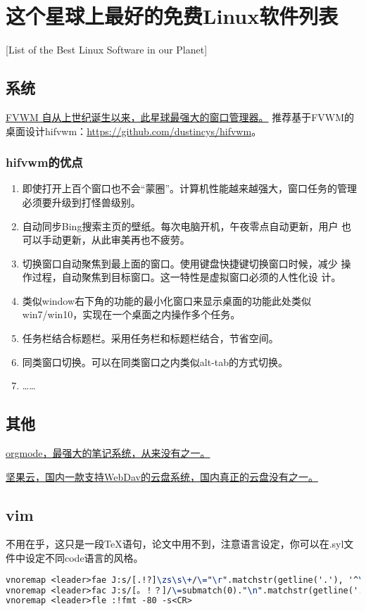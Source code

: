 
\chapter{这个星球上最好的免费Linux软件列表}[List of the Best Linux Software in our Planet]
\section{系统}

\href{http://fvwm.org/}{FVWM 自从上世纪诞生以来，此星球最强大的窗口管理器。}
推荐基于FVWM的桌面设计hifvwm：\href{https://github.com/dustincys/hifvwm}{https://github.com/dustincys/hifvwm}。

\subsection{hifvwm的优点}

\begin{enumerate}
	\item 即使打开上百个窗口也不会“蒙圈”。计算机性能越来越强大，窗口任务的管理必须要升级到打怪兽级别。
	\item 自动同步Bing搜索主页的壁纸。每次电脑开机，午夜零点自动更新，用户
	      也可以手动更新，从此审美再也不疲劳。
	\item 切换窗口自动聚焦到最上面的窗口。使用键盘快捷键切换窗口时候，减少
	      操作过程，自动聚焦到目标窗口。这一特性是虚拟窗口必须的人性化设
	      计。
	\item 类似window右下角的功能的最小化窗口来显示桌面的功能此处类似
	      win7/win10，实现在一个桌面之内操作多个任务。
	\item 任务栏结合标题栏。采用任务栏和标题栏结合，节省空间。
	\item 同类窗口切换。可以在同类窗口之内类似alt-tab的方式切换。
	\item ……
\end{enumerate}

\section{其他}

\href{https://orgmode.org/}{orgmode，最强大的笔记系统，从来没有之一。}

\href{https://www.jianguoyun.com/}{坚果云，国内一款支持WebDav的云盘系统，国内真正的云盘没有之一。}

\section{vim}
不用在乎，这只是一段\TeX 语句，论文中用不到，注意语言设定，你可以在.syl文件中设定不同code语言的风格。
\begin{lstlisting}[language = TeX]
vnoremap <leader>fae J:s/[.!?]\zs\s\+/\="\r".matchstr(getline('.'), '^\s*')/g<CR>
vnoremap <leader>fac J:s/[。！？]/\=submatch(0)."\n".matchstr(getline('.'), '^\s*')/g<CR>
vnoremap <leader>fle :!fmt -80 -s<CR>
\end{lstlisting}

